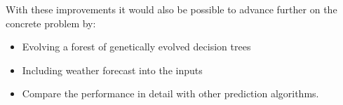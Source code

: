 \documentclass[conference]{IEEEtran}
\begin{document}
With these improvements it would also be possible to advance further on the concrete problem by:

\begin{itemize}
\item Evolving a forest of genetically evolved decision trees
\item Including weather forecast into the inputs
\item Compare the performance in detail with other prediction algorithms.
\end{itemize}










%



\end{document}
